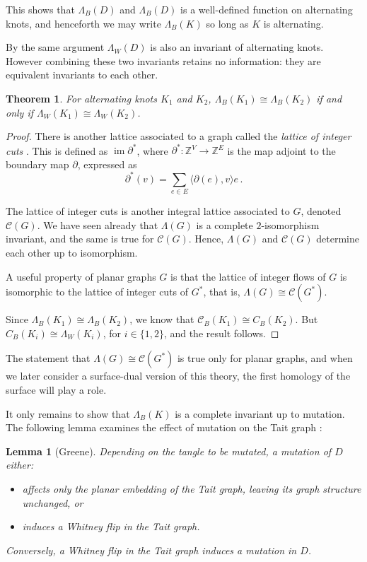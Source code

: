 \documentclass[12pt]{report}
\newcommand{\Z}{\mathbb{Z}}
\newtheorem*{theorem}{Theorem}
\newtheorem*{lemma}{Lemma}
\theoremstyle{upright}
\begin{document}
This shows that $\Lambda_{B}(D)$ and $\Lambda_{B}(D)$ is a well-defined function on alternating knots, and henceforth we may write $\Lambda_{B}(K)$ so long as $K$ is alternating.

By the same argument $\Lambda_{W}(D)$ is also an invariant of alternating knots. However combining these two invariants retains no information: they are equivalent invariants to each other.

\begin{theorem}
For alternating knots $K_{1}$ and $K_{2}$, $\Lambda_{B}(K_{1}) \cong \Lambda_{B}(K_{2})$ if and only if $\Lambda_{W}(K_{1}) \cong \Lambda_{W}(K_{2})$.
\end{theorem}

\begin{proof}
There is another lattice associated to a graph called the \textit{lattice of integer cuts} \cite{lattice-of-flows-cuts}. This is defined as $\operatorname{im} \partial^{*}$, where $\partial^{*}: \Z^{V} \longrightarrow \Z^{E}$ is the map adjoint to the boundary map $\partial$, expressed as
\[\partial^{*}(v) = \sum_{e \in E} \langle \partial(e), v \rangle e\,.\]

The lattice of integer cuts is another integral lattice associated to $G$, denoted $\mathcal{C}(G)$. We have seen already that $\Lambda(G)$ is a complete $2$-isomorphism invariant, and the same is true for $\mathcal{C}(G)$. Hence, $\Lambda(G)$ and $\mathcal{C}(G)$ determine each other up to isomorphism.

A useful property of planar graphs $G$ is that the lattice of integer flows of $G$ is isomorphic to the lattice of integer cuts of $G^{*}$, that is, $\Lambda(G) \cong \mathcal{C}(G^{*})$.

Since $\Lambda_{B}(K_{1}) \cong \Lambda_{B}(K_{2})$, we know that $\mathcal{C}_{B}(K_{1}) \cong C_{B}(K_{2})$. But $C_{B}(K_{i}) \cong \Lambda_{W}(K_{i})$, for $i \in \{1, 2\}$, and the result follows.
\end{proof}

The statement that $\Lambda(G) \cong \mathcal{C}(G^{*})$ is true only for planar graphs, and when we later consider a surface-dual version of this theory, the first homology of the surface will play a role.

It only remains to show that $\Lambda_{B}(K)$ is a complete invariant up to mutation. The following lemma examines the effect of mutation on the Tait graph \cite[Lemma 4.5]{lattices-graphs-mutation}:

\begin{lemma}[Greene]
Depending on the tangle to be mutated, a mutation of $D$ either:
\begin{itemize}
\item affects only the planar embedding of the Tait graph, leaving its graph structure unchanged, or
\item induces a Whitney flip in the Tait graph.
\end{itemize}
Conversely, a Whitney flip in the Tait graph induces a mutation in $D$.
\end{lemma}
\end{document}
